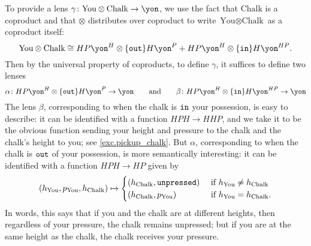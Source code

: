 \documentclass[Book-Poly]{subfiles}
\begin{document}
\begin{example}
To provide a lens $\gamma\colon\text{You}\otimes\text{Chalk}\to\yon$, we use the fact that $\text{Chalk}$ is a coproduct and that $\otimes$ distributes over coproduct to write $\text{You}\otimes\text{Chalk}$ as a coproduct itself:
\[
  \text{You}\otimes\text{Chalk}
    \iso
  HP\yon^H\otimes\{\const{out}\}H\yon^P+HP\yon^H\otimes\{\const{in}\}H\yon^{HP}.
\]
Then by the universal property of coproducts, to define $\gamma$, it suffices to define two lenses
\[
	\alpha\colon HP\yon^H\otimes\{\const{out}\}H\yon^P\to\yon
	\qqand
	\beta\colon HP\yon^H\otimes \{\const{in}\}H\yon^{HP}\to\yon
\]
The lens $\beta$, corresponding to when the chalk is $\texttt{in}$ your possession, is easy to describe: it can be identified with a function $HPH\to HHP$, and we take it to be the obvious function sending your height and pressure to the chalk and the chalk's height to you; see \cref{exc.pickup_chalk}.
But $\alpha$, corresponding to when the chalk is $\texttt{out}$ of your possession, is more semantically interesting: it can be identified with a function $HPH\to HP$ given by
\[
  (h_\text{You},p_\text{You},h_\text{Chalk})\mapsto
  \begin{cases}
  	(h_\text{Chalk},\texttt{unpressed}) & \textnormal{ if } h_\text{You} \neq h_\text{Chalk} \\
  	(h_\text{Chalk},p_\text{You}) & \textnormal{ if } h_\text{You} = h_\text{Chalk}.
  \end{cases}
\]
In words, this says that if you and the chalk are at different heights, then regardless of your pressure, the chalk remains unpressed; but if you are at the same height as the chalk, the chalk receives your pressure.


\end{example}
\end{document}
